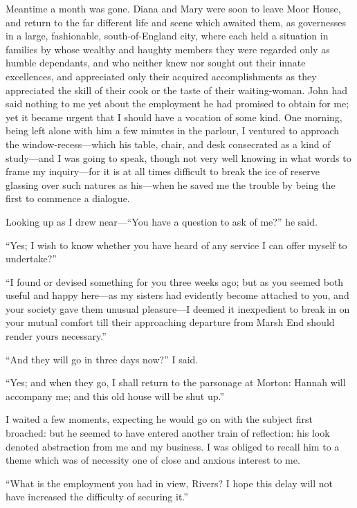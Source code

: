 Meantime a month was gone. Diana and Mary were soon to leave Moor
House, and return to the far different life and scene which awaited
them, as governesses in a large, fashionable, south-of-England city,
where each held a situation in families by whose wealthy and haughty
members they were regarded only as humble dependants, and who neither
knew nor sought out their innate excellences, and appreciated only their
acquired accomplishments as they appreciated the skill of their cook or
the taste of their waiting-woman. \Mr{} \St{} John had said nothing to me
yet about the employment he had promised to obtain for me; yet it became
urgent that I should have a vocation of some kind. One morning, being
left alone with him a few minutes in the parlour, I ventured to approach
the window-recess---which his table, chair, and desk consecrated as a
kind of study---and I was going to speak, though not very well knowing
in what words to frame my inquiry---for it is at all times difficult to
break the ice of reserve glassing over such natures as his---when he
saved me the trouble by being the first to commence a dialogue.

Looking up as I drew near---\enquote{You have a question to ask of me?}
he said.

\enquote{Yes; I wish to know whether you have heard of any service I can
	offer myself to undertake?}

\enquote{I found or devised something for you three weeks ago; but as
	you seemed both useful and happy here---as my sisters had evidently
	become attached to you, and your society gave them unusual pleasure---I
	deemed it inexpedient to break in on your mutual comfort till their
	approaching departure from Marsh End should render yours necessary.}

\enquote{And they will go in three days now?} I said.

\enquote{Yes; and when they go, I shall return to the parsonage at
	Morton: Hannah will accompany me; and this old house will be shut up.}

I waited a few moments, expecting he would go on with the subject first
broached: but he seemed to have entered another train of reflection: his
look denoted abstraction from me and my business. I was obliged to
recall him to a theme which was of necessity one of close and anxious
interest to me.

\enquote{What is the employment you had in view, \Mr{} Rivers? I hope
	this delay will not have increased the difficulty of securing it.}

